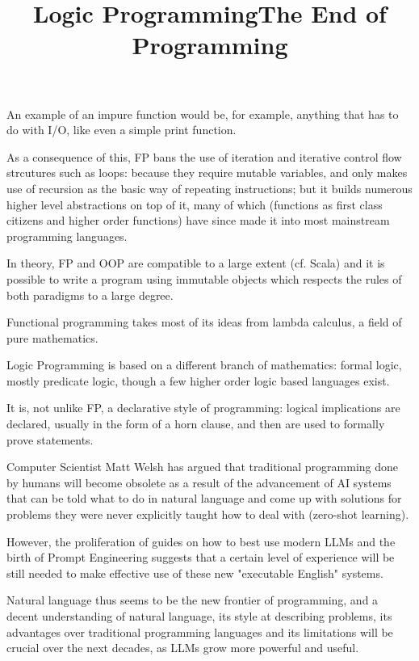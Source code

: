 An example of an impure function would be, for example, anything that has to do with I/O, like even a simple print function.

As a consequence of this, FP bans the use of iteration and iterative control flow strcutures such as loops: because they require mutable variables, and only makes use of recursion as the basic way of repeating instructions; but it builds numerous higher level abstractions on top of it, many of which (functions as first class citizens and higher order functions) have since made it into most mainstream programming languages.

In theory, FP and OOP are compatible to a large extent (cf. Scala) and it is possible to write a program using immutable objects which respects the rules of both paradigms to a large degree.

Functional programming takes most of its ideas from lambda calculus, a field of pure mathematics.



\title{Logic Programming}

Logic Programming is based on a different branch of mathematics: formal logic, mostly predicate logic, though a few higher order logic based languages exist.

It is, not unlike FP, a declarative style of programming: logical implications are declared, usually in the form of a horn clause, and then are used to formally prove statements.



\title{The End of Programming}

Computer Scientist Matt Welsh has argued that traditional programming done by humans will become obsolete as a result of the advancement of AI systems that can be told what to do in natural language and come up with solutions for problems they were never explicitly taught how to deal with (zero-shot learning).

However, the proliferation of guides on how to best use modern LLMs and the birth of Prompt Engineering suggests that a certain level of experience will be still needed to make effective use of these new "executable English" systems.

Natural language thus seems to be the new frontier of programming, and a decent understanding of natural language, its style at describing problems, its advantages over traditional programming languages and its limitations will be crucial over the next decades, as LLMs grow more powerful and useful.


